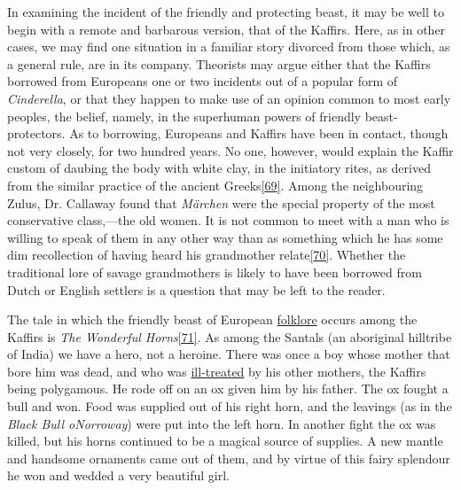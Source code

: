 \documentclass[14pt,a4paper]{memoir}
\newcommand{\ul}[1]{\uline{#1}}
\begin{document}
In examining the incident of the friendly and protecting beast, it may
be well to begin with a remote and barbarous version, that of the
Kaffirs. Here, as in other cases, we may find one situation in a
familiar story divorced from those which, as a general rule, are in its
company. Theorists may argue either that the Kaffirs borrowed from
Europeans one or two incidents out of a popular form of
\emph{Cinderella}, or that they happen to make use of an opinion common
to most early peoples, the belief, namely, in the superhuman powers of
friendly beast-protectors. As to borrowing, Europeans and Kaffirs have
been in contact, though not very closely, for two hundred years. No one,
however, would explain the Kaffir custom of daubing the body with white
clay, in the initiatory rites, as derived from the similar practice of
the ancient
Greeks\protect\hypertarget{4533318093929944247_33931-h-1.htm.xhtmlux5cux23FNanchor_69}{}{}\protect\hyperlink{4533318093929944247_33931-h-1.htm.xhtmlux5cux23Footnote_69}{{[}69{]}}.
Among the neighbouring Zulus, Dr. Callaway found that \emph{Märchen}
were the special property of the most conservative class,---the old
women. \textquotesingle It is not common to meet with a man who is
willing to speak of them in any other way than as something which he has
some dim recollection of having heard his grandmother
relate\protect\hypertarget{4533318093929944247_33931-h-1.htm.xhtmlux5cux23FNanchor_70}{}{}\protect\hyperlink{4533318093929944247_33931-h-1.htm.xhtmlux5cux23Footnote_70}{{[}70{]}}.\textquotesingle{}
Whether the traditional lore of savage grandmothers is likely to have
been borrowed from Dutch or English settlers is a question that may be
left to the reader.

The tale in which the friendly beast of European \ul{folklore} occurs
among the Kaffirs is \emph{The Wonderful
Horns}\protect\hypertarget{4533318093929944247_33931-h-1.htm.xhtmlux5cux23FNanchor_71}{}{}\protect\hyperlink{4533318093929944247_33931-h-1.htm.xhtmlux5cux23Footnote_71}{{[}71{]}}.
As among the Santals (an \textquotesingle aboriginal\textquotesingle{}
hilltribe of India) we have a hero, not a heroine.
\textquotesingle There was once a boy whose mother that bore him was
dead, and who was \ul{ill-treated} by his other
mothers,\textquotesingle{} the Kaffirs being polygamous. He rode off on
an ox given him by his father. The ox fought a bull and won. Food was
supplied out of his right horn, and the
\textquotesingle leavings\textquotesingle{} (as in the \emph{Black Bull
o\textquotesingle Norroway}) were put into the left horn. In another
fight the ox was killed, but his horns continued to be a magical source
of supplies. A new mantle and handsome ornaments came out of them, and
by virtue of this fairy splendour he won and wedded a very beautiful
girl.
\end{document}
